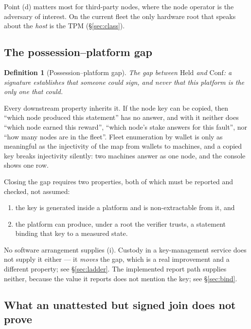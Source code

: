 \documentclass[11pt,a4paper]{article}
\newtheorem{definition}{Definition}[section]
\newcommand{\Held}{\mathrm{Held}}
\newcommand{\Conf}{\mathrm{Conf}}
\begin{document}
Point (d) matters most for third-party nodes, where the node operator is the
adversary of interest. On the current fleet the only hardware root that speaks
about the \emph{host} is the TPM (\S\ref{sec:class}).

\subsection{The possession--platform gap}
\label{sec:gap}

\begin{definition}[Possession--platform gap]
The gap between $\Held$ and $\Conf$: a signature establishes that \emph{someone}
could sign, and never that \emph{this platform} is the only one that could.
\end{definition}

Every downstream property inherits it. If the node key can be copied, then
``which node produced this statement'' has no answer, and with it neither does
``which node earned this reward'', ``which node's stake answers for this fault'',
nor ``how many nodes are in the fleet''. Fleet enumeration by wallet is only as
meaningful as the injectivity of the map from wallets to machines, and a copied
key breaks injectivity silently: two machines answer as one node, and the console
shows one row.

Closing the gap requires two properties, both of which must be reported and
checked, not assumed:

\begin{enumerate}[label=(\roman*)]
\item the key is generated inside a platform and is non-extractable from it, and
\item the platform can produce, under a root the verifier trusts, a statement
  binding that key to a measured state.
\end{enumerate}

No software arrangement supplies (i). Custody in a key-management service does
not supply it either --- it \emph{moves} the gap, which is a real improvement and
a different property; see \S\ref{sec:ladder}. The implemented report path supplies
neither, because the value it reports does not mention the key; see
\S\ref{sec:bind}.

\subsection{What an unattested but signed join does not prove}
\label{sec:notprove}
\end{document}
